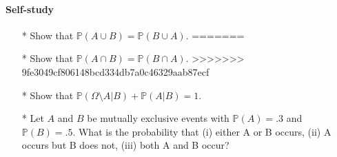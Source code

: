 \documentclass{article}
\begin{document}
\paragraph{Self-study}
\begin{enumerate}
<<<<<<< HEAD
\item[*] Show that $\mathbb{P}(A \cup B) = \mathbb{P}(B \cup A)$.
=======
\item[*] Show that $\mathbb{P}(A \cap B) = \mathbb{P}(B \cap A)$.
>>>>>>> 9fe3049cf806148bcd334db7a0c46329aab87ecf
\item[*] Show that $\mathbb{P}(\Omega \setminus A|B) + \mathbb{P}(A|B) = 1$.
\item[*] Let $A$ and $B$ be mutually exclusive events with $\mathbb{P}(A) = .3$ and $\mathbb{P}(B) = .5$. What is the probability that (i) either A or B occurs, (ii) A occurs but B does not, (iii) both A and B occur?
\end{enumerate}
\end{document}
